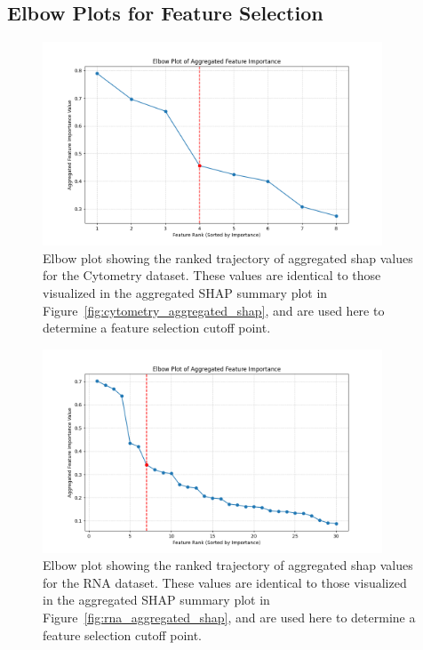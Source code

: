 \documentclass[12pt,a4paper]{report}
\begin{document}
\subsection{Elbow Plots for Feature Selection}
\label{appendix:elbow_plots}

\begin{figure}[h!]
    \centering
    \includegraphics[width=0.9\textwidth]{images/elbow_plot_cytometry_uncompressed.png}
    \caption[Elbow plot for Cytometry]{Elbow plot showing the ranked trajectory of aggregated \gls{shap} values for the Cytometry dataset. These values are identical to those visualized in the aggregated SHAP summary plot in Figure~\ref{fig:cytometry_aggregated_shap}, and are used here to determine a feature selection cutoff point.}
    \label{fig:elbow_plot_cytomery_uncompressed}
\end{figure}

\begin{figure}[h!]
    \centering
    \includegraphics[width=0.9\textwidth]{images/elbow_plot_rna_uncompressed.png}
    \caption[Elbow plot for RNA]{Elbow plot showing the ranked trajectory of aggregated \gls{shap} values for the RNA dataset. These values are identical to those visualized in the aggregated SHAP summary plot in Figure~\ref{fig:rna_aggregated_shap}, and are used here to determine a feature selection cutoff point.}
    \label{fig:elbow_plot_rna_uncompressed}
\end{figure}





\end{document}
